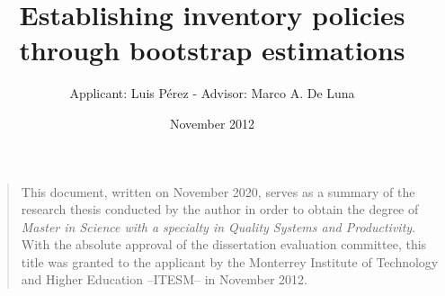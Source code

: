 \documentclass[letterpaper]{article}
\title{Establishing inventory policies through bootstrap estimations}
\author{Applicant: Luis Pérez - Advisor: Marco A. De Luna}
\date{November 2012}
\begin{document}
    
\maketitle
{}




\begin{verse}
    This document, written on November 2020, serves as a summary of the research thesis conducted by the author in order to obtain the degree of \textit{Master in Science with a specialty in Quality Systems and Productivity}. With the absolute approval of the dissertation evaluation committee, this title was granted to the applicant by the Monterrey Institute of Technology and Higher Education --ITESM-- in November 2012.
    
\paragraph{}

\end{verse}
\end{document}
